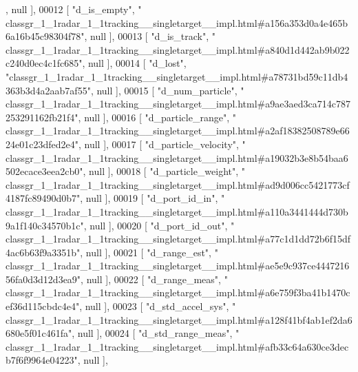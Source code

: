 \begin{DoxyCode}
      , null ],
00012     [ \textcolor{stringliteral}{"d\_is\_empty"}, \textcolor{stringliteral}{"
      classgr\_1\_1radar\_1\_1tracking\_\_singletarget\_\_impl.html#a156a353d0a4e465b6a16b45c98304f78"}, null ],
00013     [ \textcolor{stringliteral}{"d\_is\_track"}, \textcolor{stringliteral}{"
      classgr\_1\_1radar\_1\_1tracking\_\_singletarget\_\_impl.html#a840d1d442ab9b022c240d0ec4c1fc685"}, null ],
00014     [ \textcolor{stringliteral}{"d\_lost"}, \textcolor{stringliteral}{"classgr\_1\_1radar\_1\_1tracking\_\_singletarget\_\_impl.html#a78731bd59c11db4363b3d4a2aab7af55"}, 
      null ],
00015     [ \textcolor{stringliteral}{"d\_num\_particle"}, \textcolor{stringliteral}{"
      classgr\_1\_1radar\_1\_1tracking\_\_singletarget\_\_impl.html#a9ae3aed3ca714c787253291162fb21f4"}, null ],
00016     [ \textcolor{stringliteral}{"d\_particle\_range"}, \textcolor{stringliteral}{"
      classgr\_1\_1radar\_1\_1tracking\_\_singletarget\_\_impl.html#a2af18382508789e6624e01c23dfed2e4"}, null ],
00017     [ \textcolor{stringliteral}{"d\_particle\_velocity"}, \textcolor{stringliteral}{"
      classgr\_1\_1radar\_1\_1tracking\_\_singletarget\_\_impl.html#a19032b3e8b54baa6502ecace3eea2cb0"}, null ],
00018     [ \textcolor{stringliteral}{"d\_particle\_weight"}, \textcolor{stringliteral}{"
      classgr\_1\_1radar\_1\_1tracking\_\_singletarget\_\_impl.html#ad9d006cc5421773cf4187fc89490d0b7"}, null ],
00019     [ \textcolor{stringliteral}{"d\_port\_id\_in"}, \textcolor{stringliteral}{"
      classgr\_1\_1radar\_1\_1tracking\_\_singletarget\_\_impl.html#a110a3441444d730b9a1f140c34570b1c"}, null ],
00020     [ \textcolor{stringliteral}{"d\_port\_id\_out"}, \textcolor{stringliteral}{"
      classgr\_1\_1radar\_1\_1tracking\_\_singletarget\_\_impl.html#a77c1d1dd72b6f15df4ac6b63f9a3351b"}, null ],
00021     [ \textcolor{stringliteral}{"d\_range\_est"}, \textcolor{stringliteral}{"
      classgr\_1\_1radar\_1\_1tracking\_\_singletarget\_\_impl.html#ae5e9c937ce444721656fa0d3d12d3ea9"}, null ],
00022     [ \textcolor{stringliteral}{"d\_range\_meas"}, \textcolor{stringliteral}{"
      classgr\_1\_1radar\_1\_1tracking\_\_singletarget\_\_impl.html#a6e759f3ba41b1470cef36d115cbdc4e4"}, null ],
00023     [ \textcolor{stringliteral}{"d\_std\_accel\_sys"}, \textcolor{stringliteral}{"
      classgr\_1\_1radar\_1\_1tracking\_\_singletarget\_\_impl.html#a128f41bf4ab1ef2da6680e5f01c461fa"}, null ],
00024     [ \textcolor{stringliteral}{"d\_std\_range\_meas"}, \textcolor{stringliteral}{"
      classgr\_1\_1radar\_1\_1tracking\_\_singletarget\_\_impl.html#afb33c64a630ce3decb7f6f9964e04223"}, null ],

\end{DoxyCode}
